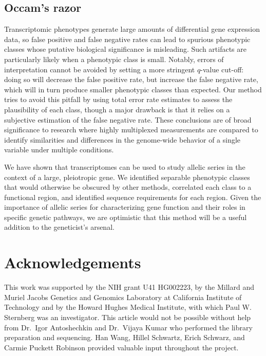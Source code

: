 \documentclass[9pt,twocolumn,twoside]{gsajnl}
\begin{document}
\subsection*{Occam's razor}
Transcriptomic phenotypes generate large amounts of differential gene expression
data, so false positive and false negative rates can lead to spurious phenotypic
classes whose putative biological significance is misleading. Such
artifacts are particularly likely when a phenotypic class is small. Notably,
errors of interpretation cannot be avoided by setting a more stringent $q$-value
cut-off: doing so will decrease the false positive rate, but increase the false
negative rate, which will in turn produce smaller phenotypic classes than
expected. Our method tries to avoid this pitfall by using total error rate
estimates to assess the plausibility of each class, though a major drawback is
that it relies on a subjective estimation of the false negative rate. These
conclusions are of broad significance to research where highly multiplexed
measurements are compared to identify similarities and differences in the
genome-wide behavior of a single variable under multiple conditions.

We have shown that transcriptomes can be used to study allelic series in the
context of a large, pleiotropic gene. We identified separable phenotypic classes
that would otherwise be obscured by other methods, correlated each class to a
functional region, and identified sequence requirements for each region. Given
the importance of allelic series for characterizing gene function and their
roles in specific genetic pathways, we are optimistic that this method will be a
useful addition to the geneticist's arsenal.

\section*{Acknowledgements}
This work was supported by the NIH grant U41 HG002223, by the Millard and Muriel
Jacobs Genetics and Genomics Laboratory at California Institute of Technology
and by the Howard Hughes Medical Institute, with which Paul W. Sternberg was an
investigator. This article would not be possible without help from Dr.\ Igor
Antoshechkin and Dr.\ Vijaya Kumar who performed the library preparation and
sequencing. Han Wang, Hillel Schwartz, Erich Schwarz, and Carmie Puckett
Robinson provided valuable input throughout the project.


% 

\end{document}
